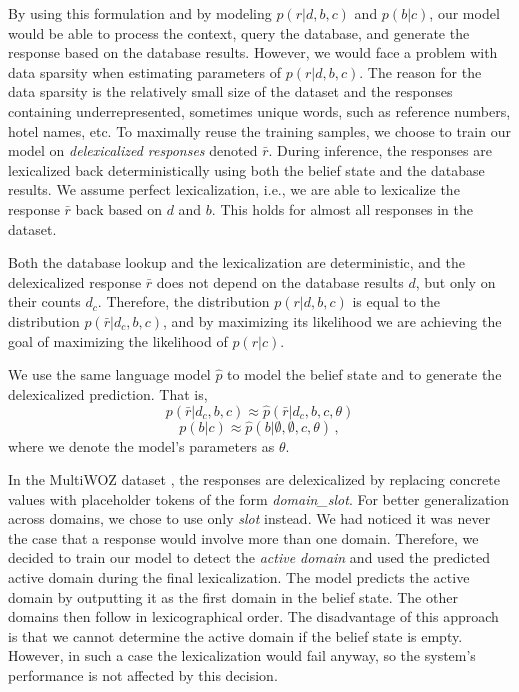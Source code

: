 \documentclass[letterpaper]{article} %
\begin{document}
By using this formulation and by modeling $p(r|d,b,c)$ and $p(b|c)$, our model would be able to process the context, query the database, and generate the response based on the database results. However, we would face a problem with data sparsity when estimating parameters of $p(r|d,b,c)$. The reason for the data sparsity is the relatively small size of the dataset and the responses containing underrepresented, sometimes unique words, such as reference numbers, hotel names, etc. To maximally reuse the training samples, we choose to train our model on \emph{delexicalized responses} \cite{wen2015} denoted $\bar{r}$. During inference, the responses are lexicalized back deterministically using both the belief state and the database results. We assume perfect lexicalization, i.e., we are able to lexicalize the response $\bar{r}$ back based on $d$ and $b$. This holds for almost all responses in the dataset.


Both the database lookup and the lexicalization are deterministic, and the delexicalized response $\bar{r}$ does not depend on the database results $d$, but only on their counts $d_c$. Therefore, the distribution $p(r|d,b,c)$ is equal to the distribution $p(\bar{r}|d_c,b,c)$, and by maximizing its likelihood we are achieving the goal of maximizing the likelihood of $p(r|c)$.

We use the same language model $\hat{p}$ to model the belief state and to generate the delexicalized prediction. That is,
\begin{equation}
    p(\bar{r}|d_c,b,c) \approx \hat{p}(\bar{r}|d_c,b,c,\theta)
\end{equation}
\begin{equation}
    p(b|c) \approx \hat{p}(b|\emptyset,\emptyset,c,\theta)\,,
\end{equation}
where we denote the model's parameters as $\theta$.

In the MultiWOZ dataset \cite{budzianowski2018,eric2019}, the responses are delexicalized by replacing concrete values with placeholder tokens of the form \textit{domain\_slot}. For better generalization across domains, we chose to use only \textit{slot} instead. We had noticed it was never the case that a response would involve more than one domain. Therefore, we decided to train our model to detect the \textit{active domain} and used the predicted active domain during the final lexicalization. The model predicts the active domain by outputting it as the first domain in the belief state. The other domains then follow in lexicographical order. The disadvantage of this approach is that we cannot determine the active domain if the belief state is empty. However, in such a case the lexicalization would fail anyway, so the system's performance is not affected by this decision.
\end{document}
